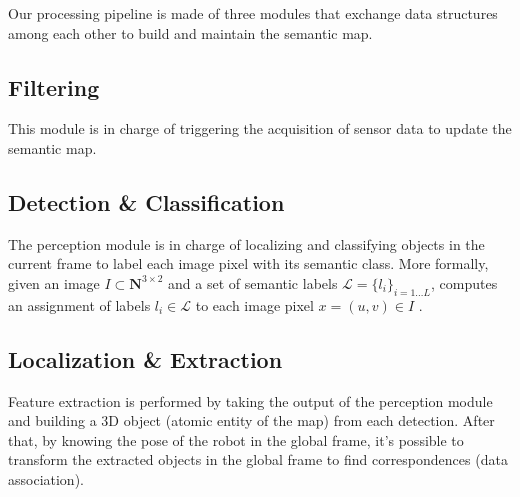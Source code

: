 \documentclass{article}
\begin{document}
	Our processing pipeline is made of three modules that exchange data structures among each other to build and maintain the semantic map.
	
	\subsection{Filtering}
	
	This module is in charge of triggering the acquisition of sensor data to update the semantic map.

	\subsection{Detection \& Classification}
	
	The perception module is in charge of localizing and classifying objects in the current frame to label each image pixel with its semantic class. More formally, given an image $I \subset \mathbf{N}^{3 \times 2}$ and a set of semantic labels $\mathcal{L} = \{l_i\}_{i=1 \dots L}$, computes an assignment of labels $l_i \in \mathcal{L}$ to each image pixel $x = (u,v) \in I$ .
	
	\subsection{Localization \& Extraction}
	
	Feature extraction is performed by taking the output of the perception module and building a 3D object (atomic entity of the map) from each detection. After that, by knowing the pose of the robot in the global frame, it's possible to transform the extracted objects in the global frame to find correspondences (data association).
	
\end{document}
